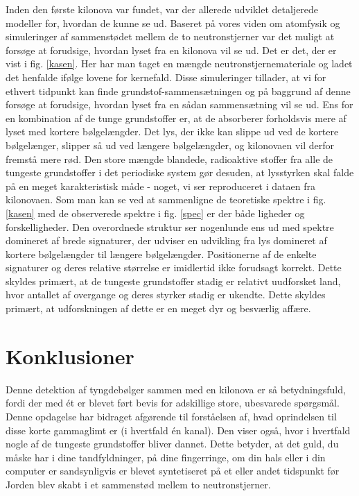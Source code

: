 \documentclass[twocolumn]{article}
\begin{document}
Inden den første kilonova var fundet, var der allerede udviklet detaljerede modeller for, hvordan de kunne se ud. Baseret på vores viden om atomfysik og  simuleringer af sammenstødet mellem de to neutronstjerner var det muligt at forsøge at forudsige, hvordan lyset fra en kilonova vil se ud. Det er det, der er vist i fig. \ref{kasen}. Her har man taget en mængde neutronstjernemateriale og ladet det henfalde ifølge lovene for kernefald. Disse simuleringer tillader, at vi for ethvert tidpunkt kan finde grundstof-sammensætningen og på baggrund af denne forsøge at forudsige, hvordan lyset fra en sådan sammensætning vil se ud. Ens for en kombination af de tunge grundstoffer er, at de absorberer forholdsvis mere af lyset med kortere bølgelængder. Det lys, der ikke kan slippe ud ved de kortere bølgelænger, slipper så ud ved længere bølgelængder, og kilonovaen vil derfor fremstå mere rød. Den store mængde blandede, radioaktive stoffer fra alle de tungeste grundstoffer i det periodiske system gør desuden, at lysstyrken skal falde på en meget karakteristisk måde - noget, vi ser reproduceret i dataen fra kilonovaen. Som man kan se ved at sammenligne de teoretiske spektre i fig. \ref{kasen} med de observerede spektre i fig. \ref{spec} er der både ligheder og forskelligheder. Den overordnede struktur ser nogenlunde ens ud med spektre domineret af brede signaturer, der udviser en udvikling fra lys domineret af kortere bølgelængder til længere bølgelængder. Positionerne af de enkelte signaturer og deres relative størrelse er imidlertid ikke forudsagt korrekt. Dette skyldes primært, at de tungeste grundstoffer stadig er relativt uudforsket land, hvor antallet af overgange og deres styrker stadig er ukendte. Dette skyldes primært, at udforskningen af dette er en meget dyr og besværlig affære.



\section{Konklusioner}
Denne detektion af tyngdebølger sammen med en kilonova er så betydningsfuld, fordi der med ét er blevet ført bevis for adskillige store, ubesvarede spørgsmål. Denne opdagelse har bidraget afgørende til forståelsen af, hvad oprindelsen til disse korte gammaglimt er (i hvertfald én kanal). Den viser også, hvor i hvertfald nogle af de tungeste grundstoffer bliver dannet. Dette betyder, at det guld, du måske har i dine tandfyldninger, på dine fingerringe, om din hals eller i din computer er sandsynligvis er blevet syntetiseret på et eller andet tidspunkt før Jorden blev skabt i et sammenstød mellem to neutronstjerner.
\end{document}
